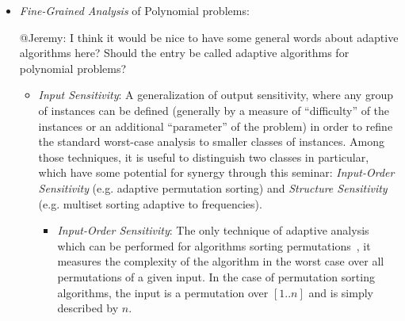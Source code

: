 \documentclass[a4paper,10pt]{article}
\begin{document}
\begin{itemize}

\item \emph{Fine-Grained Analysis} of Polynomial problems:
\begin{TODO}
\begin{STEFAN}
@Jeremy: I think it would be nice to have some general words about adaptive algorithms here? Should the entry be called adaptive algorithms for polynomial problems?
\end{STEFAN}
\end{TODO}
  \begin{itemize}

\item \emph{Input Sensitivity}: A generalization of output sensitivity, where any group of instances can be defined (generally by a measure of ``difficulty'' of the instances or an additional ``parameter'' of the problem) in order to refine the standard worst-case analysis to smaller classes of instances. Among those techniques, it is useful to distinguish two classes in particular, which have some potential for synergy through this seminar: \emph{Input-Order Sensitivity} (e.g. adaptive permutation sorting) and \emph{Structure Sensitivity} (e.g. multiset sorting adaptive to frequencies).
  \begin{LONG}
  \begin{itemize}
\item \emph{Input-Order Sensitivity}: The only technique of adaptive analysis which can be performed for algorithms sorting permutations~\cite{1992-ACMCS-ASurveyOfAdaptiveSortingAlgorithms-EstivillCastroWood,1995-DAM-AFrameworkForAdaptiveSorting-PeterssonMoffat,2013-TCS-CompressedRepresentationsOfPermutationsAndApplications-BarbayNavarro,2012-TCS-LRMTreesCompressedIndicesAdaptiveSortingAndCompressedPermutations-BarbayFischerNavarro,1994-IC-SortingShuffledMonotoneSequences-LevcopoulosPetersson,1985-TCom-MeasuresOfPresortednessAndOptimalSortingAlgorithms-Mannila,1979-CTCS-SortingPresortedFiles-Mehlhorn,1980-CACM-BestSortingAlgorithmForNearlySortedLists-CookKim,1958-InfAndC-SortingTreesAndMeasuresOfORder-Burge}, it measures the complexity of the algorithm in the worst case over all permutations of a given input. In the case of permutation sorting algorithms, the input is a permutation over $[1..n]$ and is simply described by $n$.


\end{itemize}
\end{LONG}
\end{itemize}
\end{itemize}
\end{document}
